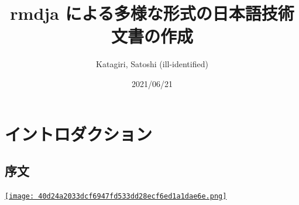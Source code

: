 \documentclass[
  xelatex,ja=standard,jafont=noto]{bxjsbook}
\title{\textbf{rmdja} による多様な形式の日本語技術文書の作成}
\author{Katagiri, Satoshi (ill-identified)}
\date{2021/06/21}
\theoremstyle{definition}
\theoremstyle{definition}
\theoremstyle{definition}
\theoremstyle{definition}
\theoremstyle{remark}
\begin{document}
\maketitle

{
\hypersetup{linkcolor=}
\setcounter{tocdepth}{2}
\tableofcontents
}
\hypertarget{part-ux30a4ux30f3ux30c8ux30edux30c0ux30afux30b7ux30e7ux30f3}{%
\part{
イントロダクション}\label{part-ux30a4ux30f3ux30c8ux30edux30c0ux30afux30b7ux30e7ux30f3}}

\hypertarget{ux5e8fux6587}{%
\chapter*{序文}\label{ux5e8fux6587}}

\href{https://creativecommons.org/licenses/by-nc/4.0/deed.ja}{\texttt{[image: 40d24a2033dcf6947fd533dd28ecf6ed1a1dae6e.png]}}
\end{document}
